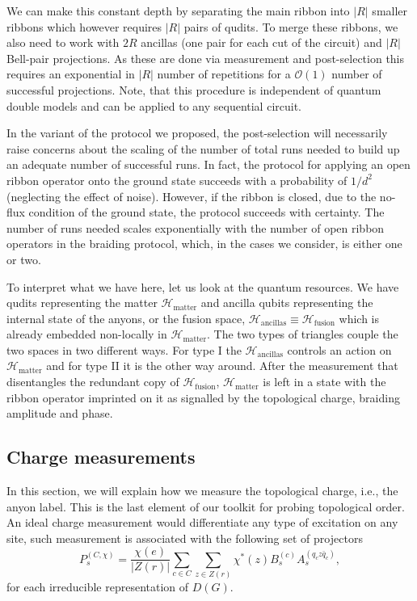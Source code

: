 \documentclass[a4paper,twocolumn,11pt, accepted=2024-06-14]{quantumarticle}
\begin{document}
We can make this constant depth by separating the main ribbon into $|R|$ smaller ribbons which however requires $|R|$ pairs of qudits. To merge these ribbons, we also need to work with $2R$ ancillas (one pair for each cut of the circuit) and $|R|$ Bell-pair projections. As these are done via measurement and post-selection this requires an exponential in $|R|$ number of repetitions for a $\mathcal{O}(1)$ number of successful projections. Note, that this procedure is independent of quantum double models and can be applied to any sequential circuit.

In the variant of the protocol we proposed, the post-selection will necessarily raise concerns about the scaling of the number of total runs needed to build up an adequate number of successful runs. In fact, the protocol for applying an open ribbon operator onto the ground state succeeds with a probability of $1/d^2$ (neglecting the effect of noise). However, if the ribbon is closed, due to the no-flux condition of the ground state, the protocol succeeds with certainty. The number of runs needed scales exponentially with the number of open ribbon operators in the braiding protocol, which, in the cases we consider, is either one or two. 

To interpret what we have here, let us look at the quantum resources. We have qudits representing the matter $\mathcal{H}_{\text{matter}}$ and ancilla qubits representing the internal state of the anyons, or the fusion space, $\mathcal{H}_{\text{ancillas}} \equiv \mathcal{H}_{\text{fusion}}$ which is already embedded non-locally in  $\mathcal{H}_{\text{matter}}$. The two types of triangles couple the two spaces in two different ways. For type I the $\mathcal{H}_{\text{ancillas}}$ controls an action on $\mathcal{H}_{\text{matter}}$ and for type II it is the other way around. After the measurement that disentangles the redundant copy of $\mathcal{H}_{\text{fusion}}$, $\mathcal{H}_{\text{matter}}$ is left in a state with the ribbon operator imprinted on it as signalled by the topological charge, braiding amplitude and phase.


\subsection{Charge measurements}\label{sec:redchmmt}

In this section, we will explain how we measure the topological charge, i.e., the anyon label. This is the last element of our toolkit for probing topological order. An ideal charge measurement would differentiate any type of excitation on any site, such measurement is associated with the following set of projectors ~\cite{cui2018topological}
\begin{equation}
    P_s^{(C, \chi)} = \frac{\chi(e)}{|Z(r)|}\sum_{c \in C}\sum_{z \in Z(r)}\chi^*(z)B_s^{(c)}A_s^{(q_c z \bar{q}_c)},
\end{equation}
for each irreducible representation of $D(G)$.
\end{document}
